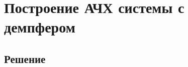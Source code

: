 \documentclass[11pt]{article}
\begin{document}
    \hypertarget{ux43fux43eux441ux442ux440ux43eux435ux43dux438ux435-ux430ux447ux445-ux441ux438ux441ux442ux435ux43cux44b-ux441-ux434ux435ux43cux43fux444ux435ux440ux43eux43c}{%
\section{Построение АЧХ системы с
демпфером}\label{ux43fux43eux441ux442ux440ux43eux435ux43dux438ux435-ux430ux447ux445-ux441ux438ux441ux442ux435ux43cux44b-ux441-ux434ux435ux43cux43fux444ux435ux440ux43eux43c}}

    \hypertarget{ux440ux435ux448ux435ux43dux438ux435}{%
\subsection{Решение}\label{ux440ux435ux448ux435ux43dux438ux435}}
\end{document}
